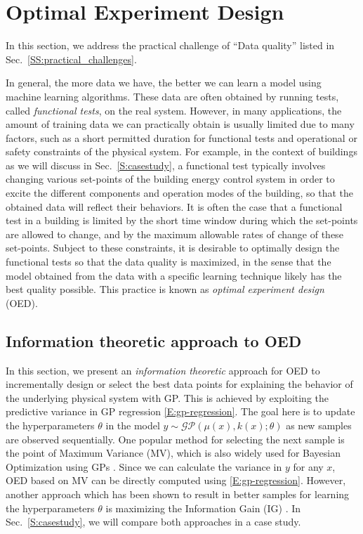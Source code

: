 \section{Optimal Experiment Design}
\label{S:oed}

In this section, we address the practical challenge of ``Data quality'' listed in Sec.~\ref{SS:practical_challenges}.

In general, the more data we have, the better we can learn a model using machine learning algorithms.
These data are often obtained by running tests, called \emph{functional tests}, on the real system.
However, in many applications, the amount of training data we can practically obtain is usually limited due to many factors, such as a short permitted duration for functional tests and operational or safety constraints of the physical system.
For example, in the context of buildings as we will discuss in Sec.~\ref{S:casestudy}, a functional test typically involves changing various set-points of the building energy control system in order to excite the different components and operation modes of the building, so that the obtained data will reflect their behaviors.
It is often the case that a functional test in a building is limited by the short time window during which the set-points are allowed to change, and by the maximum allowable rates of change of these set-points.
Subject to these constraints, it is desirable to optimally design the functional tests so that the data quality is maximized, in the sense that the model obtained from the data with a specific learning technique likely has the best quality possible.
This practice is known as \emph{optimal experiment design} (OED).


\subsection{Information theoretic approach to OED}
\label{SS:information-theory}

In this section, we present an \emph{information theoretic} approach for OED to incrementally design or select the best data points for explaining the behavior of the underlying physical system with GP.
This is achieved by exploiting the predictive variance in GP regression \eqref{E:gp-regression}.
The goal here is to update the hyperparameters \(\theta\) in the model \(y \sim \mathcal{GP}(\mu(x), k(x); \theta)\) as new samples are observed sequentially.
One popular method for selecting the next sample is the point of Maximum Variance (MV), which is also widely used for Bayesian Optimization using GPs \cite{Snoek2012}.
Since we can calculate the variance in \(y\) for any \(x\), OED based on MV can be directly computed using \eqref{E:gp-regression}.
However, another approach which has been shown to result in better samples for learning the hyperparameters \(\theta\) is maximizing the Information Gain (IG) \cite{Krause2008}. In Sec.~\ref{S:casestudy}, we will compare both approaches in a case study.

